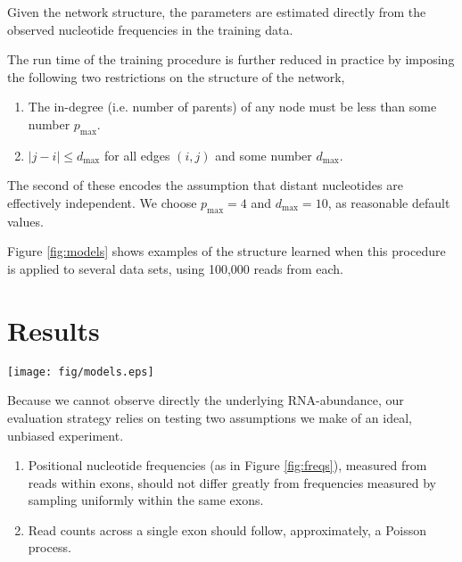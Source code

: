 \documentclass{bioinfo}
\begin{document}
Given the network structure, the parameters are estimated directly from the
observed nucleotide frequencies in the training data.

The run time of the training procedure is further reduced in practice by imposing the
following two restrictions on the structure of the network,
\begin{enumerate}
\item The in-degree (i.e. number of parents) of any node must be less than some
number $p_{\text{max}}$.
\item $|j - i| \le d_{\text{max}}$ for all edges $(i,j)$ and some number $d_{\text{max}}$.
\end{enumerate}
The second of these encodes the assumption that distant nucleotides are
effectively independent. We choose $p_{\text{max}} = 4$ and $d_{\text{max}} =
10$, as reasonable default values.

Figure \ref{fig:models} shows examples of the structure learned when this
procedure is applied to several data sets, using 100,000 reads from each.


\section{Results}

\begin{figure*}
\centerline{\texttt{[image: fig/models.eps]}}
\caption{
The network structures learned on each of the data sets are examined. Positions
are relative to the read start, which is labeled 0. Hollow circles indicate
position that were not included in the model, being deemed uninformative, give
the other positions and edges. The number of parameters of parameters needed to
specify each model is listed in parenthesis below.}
\label{fig:models}
\end{figure*}


Because we cannot observe directly the underlying RNA-abundance, our evaluation
strategy relies on testing two assumptions we make of an ideal, unbiased experiment.
\begin{enumerate}
\item Positional nucleotide frequencies (as in Figure \ref{fig:freqs}), measured
from reads within exons, should not differ greatly from frequencies measured by
sampling uniformly within the same exons.
\item Read counts across a single exon should follow, approximately, a Poisson
process.
\end{enumerate}
\end{document}
